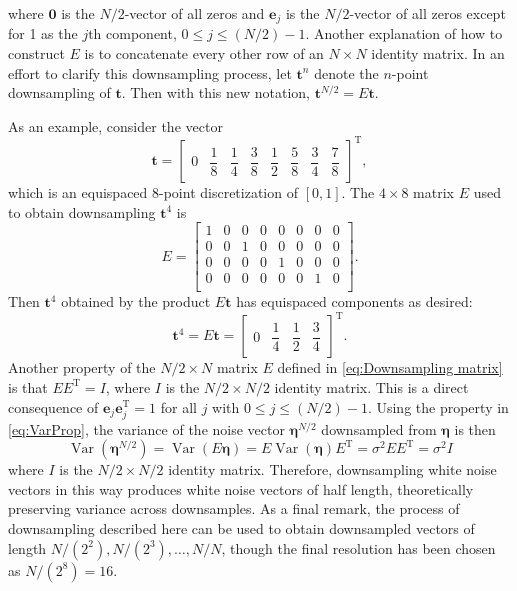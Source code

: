 \documentclass[12pt,notitlepage]{report}
\newcommand{\tVec}{\mathbf{t}}	%
\newcommand{\trans}{\mathrm{T}}	%
\newcommand{\noise}{\eta}	%
\newcommand{\noiseSD}{\sigma}	%
\newcommand{\noiseVec}{\bm{\noise}}	%
\DeclareMathOperator{\Var}{Var}	%
\begin{document}
where $\mathbf{0}$ is the $N/2$-vector of all zeros and $\mathbf{e}_j$ is the $N/2$-vector of all zeros except for 1 as the $j\text{th}$ component, $0 \leq j \leq (N/2)-1$. Another explanation of how to construct $E$ is to concatenate every other row of an $N \times N$ identity matrix. In an effort to clarify this downsampling process, let $\tVec^{n}$ denote the $n$-point downsampling of $\tVec$. Then with this new notation, $\tVec^{N/2} = E\tVec$. \par
As an example, consider the vector
\[\tVec = \begin{bmatrix}
0 & \dfrac{1}{8} & \dfrac{1}{4} & \dfrac{3}{8} & \dfrac{1}{2} & \dfrac{5}{8} & \dfrac{3}{4} & \dfrac{7}{8}
\end{bmatrix}^{\trans},\]
which is an equispaced 8-point discretization of $[0,1]$. The $4 \times 8$ matrix $E$ used to obtain downsampling $\tVec^{4}$ is
\[E = \begin{bmatrix}
1 & 0 & 0 & 0 & 0 & 0 & 0 & 0 \\
0 & 0 & 1 & 0 & 0 & 0 & 0 & 0 \\
0 & 0 & 0 & 0 & 1 & 0 & 0 & 0 \\
0 & 0 & 0 & 0 & 0 & 0 & 1 & 0 \\
\end{bmatrix}.\]
Then $\tVec^4$ obtained by the product $E\tVec$ has equispaced components as desired:
\[\tVec^4 = E\tVec = \begin{bmatrix}
0 & \dfrac{1}{4} & \dfrac{1}{2} & \dfrac{3}{4}
\end{bmatrix}^{\trans}.\]
\indent Another property of the $N/2 \times N$ matrix $E$ defined in \eqref{eq:Downsampling matrix} is that $EE^{\trans} = I$, where $I$ is the $N/2 \times N/2$ identity matrix.  This is a direct consequence of $\mathbf{e}_j\mathbf{e}_j^\trans = 1$ for all $j$ with $0 \leq j \leq (N/2)-1$. Using the property in \eqref{eq:VarProp}, the variance of the  noise vector $\noiseVec^{N/2}$ downsampled from $\noiseVec$ is then
\[\Var(\noiseVec^{N/2}) = \Var(E\noiseVec) = E\Var(\noiseVec)E^{\trans} = \noiseSD^2EE^{\trans} = \noiseSD^2I\]
where $I$ is the $N/2 \times N/2$ identity matrix. Therefore, downsampling white noise vectors in this way produces white noise vectors of half length, theoretically preserving variance across downsamples. As a final remark, the process of downsampling described here can be used to obtain downsampled vectors of length $N/(2^2), N/(2^3), \ldots, N/N$, though the final resolution has been chosen as $N/(2^8) = 16$. \par
\end{document}
